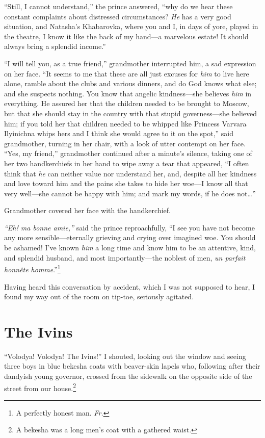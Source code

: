 ``Still, I cannot understand,'' the prince answered, ``why do we hear these constant complaints about distressed circumstances? \emph{He} has a very good situation, and Natasha's Khabarovka, where you and I, in days of yore, played in the theatre, I know it like the back of my hand---a marvelous estate! It should always bring a splendid income.'' %

``I will tell you, as a true friend,'' grandmother interrupted him, a sad expression on her face. ``It seems to me that these are all just excuses for \emph{him} to live here alone, ramble about the clubs and various dinners, and do God knows what else; and she suspects nothing. You know that angelic kindness---she believes \emph{him} in everything. He assured her that the children needed to be brought to Moscow, but that she should stay in the country with that stupid governess---she believed him; if you told her that children needed to be whipped like Princess Varvara Ilyinichna whips hers and I think she would agree to it on the spot,'' said grandmother, turning in her chair, with a look of utter contempt on her face. ``Yes, my friend,'' grandmother continued after a minute's silence, taking one of her two handkerchiefs in her hand to wipe away a tear that appeared, ``I often think that \emph{he} can neither value nor understand her, and, despite all her kindness and love toward him and the pains she takes to hide her woe---I know all that very well---she cannot be happy with him; and mark my words, if he does not\ldots{}'' %

Grandmother covered her face with the handkerchief.

\textit{``Eh! ma bonne amie,''} said the prince reproachfully, ``I see you have not become any more sensible---eternally grieving and crying over imagined woe. You should be ashamed! I've known \emph{him} a long time and know him to be an attentive, kind, and splendid husband, and most importantly---the noblest of men, \textit{un parfait honn\^ete homme}.''\footnote{A perfectly honest man. \textit{Fr.}} %

Having heard this conversation by accident, which I was not supposed to hear, I found my way out of the room on tip-toe, seriously agitated.

\chapter{The Ivins} %

``Volodya! Volodya! The Ivins!'' I shouted, looking out the window and seeing three boys in blue bekesha coats with beaver-skin lapels who, following after their dandyish young governor, crossed from the sidewalk on the opposite side of the street from our house.\footnote{A bekesha was a long men's coat with a gathered waist.}

